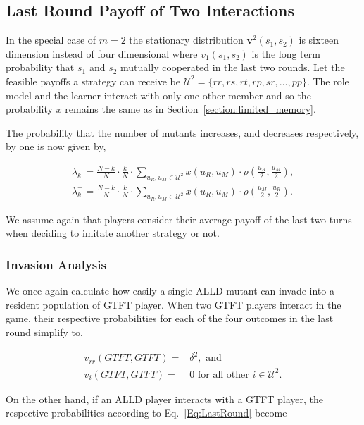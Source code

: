\documentclass[11pt]{article}
\theoremstyle{plainCl1}
\theoremstyle{plainCl2}
\begin{document}
\subsection{Last Round Payoff of Two Interactions}

In the special case of $m=2$ the stationary distribution \(\mathbf{v}^{2}(s_1,
s_2)\) is sixteen dimension instead of four dimensional where \(v_{1}(s_1, s_2)\) is
the long term probability that \(s_1\) and \(s_2\) mutually cooperated in the
last two rounds. Let the feasible payoffs a strategy can receive
be $\mathcal{U}^{2} = \{rr, rs, rt, rp, sr, \dots, pp\}$.
The role model and the learner interact with only one other member and so the
probability \(x\) remains the same as in Section~\ref{section:limited_memory}.

The probability that the number of mutants increases, and decreases respectively,
by one is now given by,

\begin{align}
\lambda^+_k=\frac{N\!-\!k}{N}\cdot \frac{k}{N} \cdot \sum_{u_{R},u_{M}\in\mathcal{U}^{2}} x(u_{R},u_{M})\cdot \rho\left(\frac{u_{R}}{2},\frac{u_{M}}{2}\right), \\
\lambda^-_k=\frac{N\!-\!k}{N}\cdot \frac{k}{N} \cdot \sum_{u_{R},u_{M}\in\mathcal{U}^{2}} x(u_{R},u_{M})\cdot \rho\left(\frac{u_{M}}{2},\frac{u_{R}}{2}\right).
\end{align}

We assume again that players consider their average payoff of the last two turns
when deciding to imitate another strategy or not.

\subsubsection*{Invasion Analysis}

We once again calculate how easily a single ALLD mutant can invade into a
resident population of GTFT player. When two GTFT players interact in the game,
their respective probabilities for each of the four outcomes in the last round
simplify to,

\begin{align*}
    v_{rr}(GTFT,GTFT) = & \delta^2, \text{ and }\\
    v_{i}(GTFT,GTFT) = &  0 \text{ for all other } i \in \mathcal{U}^{2}.
\end{align*}

On the other hand, if an ALLD player interacts with a GTFT player, the
respective probabilities according to Eq.~\ref{Eq:LastRound} become
\end{document}

